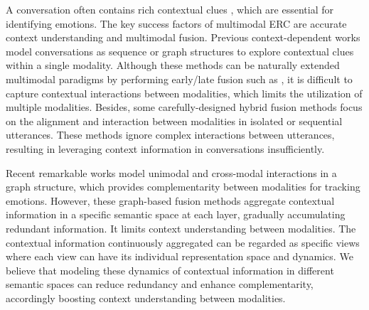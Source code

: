 A conversation often contains rich contextual clues \cite{DBLP:conf/acl/PoriaHMNCM19,DBLP:conf/acl/HuWH20}, which are essential for identifying emotions.
The key success factors of multimodal ERC are accurate context understanding and multimodal fusion.
Previous context-dependent works \cite{DBLP:conf/aaai/MajumderPHMGC19,DBLP:conf/emnlp/GhosalMPCG19,DBLP:conf/acl/HuWH20} model conversations as sequence or graph structures to explore contextual clues within a single modality. %
Although these methods can be naturally extended multimodal paradigms by performing early/late fusion such as \cite{DBLP:conf/acl/PoriaCHMZM17, DBLP:conf/emnlp/HazarikaPMCZ18, DBLP:conf/icmcs/FuOWGSLD21}, it is difficult to capture contextual interactions between modalities, which limits the utilization of multiple modalities.
Besides, some carefully-designed hybrid fusion methods \cite{DBLP:conf/emnlp/ZadehCPCM17,DBLP:conf/acl/MorencyLZLSL18,DBLP:conf/aaai/ZadehLMPCM18,DBLP:conf/mm/ChenSOLS21} focus on the alignment and interaction between modalities in isolated or sequential utterances. 
These methods  
ignore complex interactions between utterances, 
resulting in leveraging context information in conversations insufficiently.

Recent remarkable works \cite{DBLP:conf/acl/HuLZJ20,DBLP:conf/icassp/LiuCWLFGD21} model unimodal and cross-modal interactions in a graph structure, which provides complementarity between modalities for tracking emotions. %
However, these graph-based fusion methods aggregate contextual information in a specific semantic space at each layer, gradually accumulating redundant information. 
It limits context understanding between modalities. 
The contextual information continuously aggregated can be regarded as specific views where each view can have its individual representation space and dynamics.
We believe that modeling these dynamics of contextual information in different semantic spaces can reduce redundancy and enhance complementarity, accordingly boosting context understanding between modalities.


